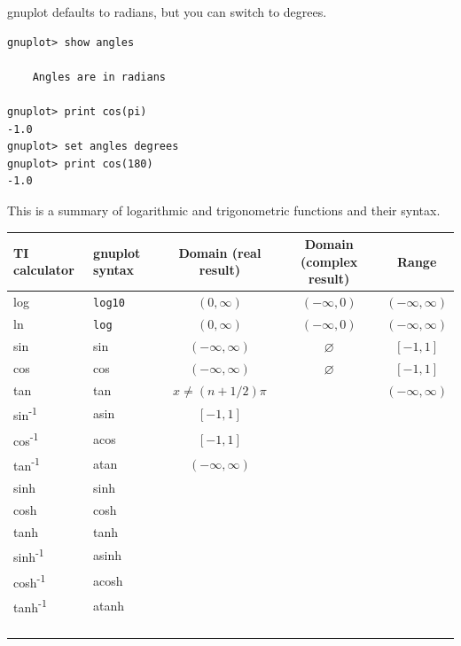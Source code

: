 \documentclass[11pt,letterpaper]{report}
\begin{document}
gnuplot defaults to radians, but you can switch to degrees.

\begin{lstlisting}
gnuplot> show angles

	Angles are in radians

gnuplot> print cos(pi)
-1.0
gnuplot> set angles degrees
gnuplot> print cos(180)
-1.0
\end{lstlisting}

This is a summary of logarithmic and trigonometric functions and their syntax.

\noindent
\begin{tabular}{|l|l|c|c|c|}
\hline 
TI calculator & gnuplot syntax & Domain (real result) & Domain (complex result) & Range\\ 
\hline 
log & \verb+log10+ & $(0, \infty)$ & $(-\infty,0)$ & $(-\infty,\infty)$ \\
\hline
ln & \verb+log+ & $(0, \infty)$ & $(-\infty,0)$ & $(-\infty,\infty)$ \\ 
\hline
sin & sin & $(-\infty,\infty)$ & $\varnothing$ & $[-1,1]$ \\
\hline
cos & cos & $(-\infty,\infty)$ & $\varnothing$ & $[-1,1]$ \\ 
\hline
tan & tan & $x \neq (n+1/2)\pi$ & & $(-\infty,\infty)$ \\
\hline
sin\textsuperscript{-1}& asin & $[-1,1]$ &  & \\ 
\hline
cos\textsuperscript{-1}& acos & $[-1,1]$ & &  \\
\hline
tan\textsuperscript{-1}& atan & $(-\infty,\infty)$ & & \\ 
\hline
sinh & sinh & & & \\ 
\hline
cosh & cosh & & & \\ 
\hline
tanh & tanh & & & \\ 
\hline
sinh\textsuperscript{-1}& asinh & & & \\ 
\hline
cosh\textsuperscript{-1}& acosh & & & \\ 
\hline
tanh\textsuperscript{-1}& atanh & & & \\ 
\hline
& & & &  \\ 
\hline
& & & &  \\ 
\hline
& & & &  \\ 
\hline
& & & &  \\ 
\hline
\end{tabular}
\end{document}
